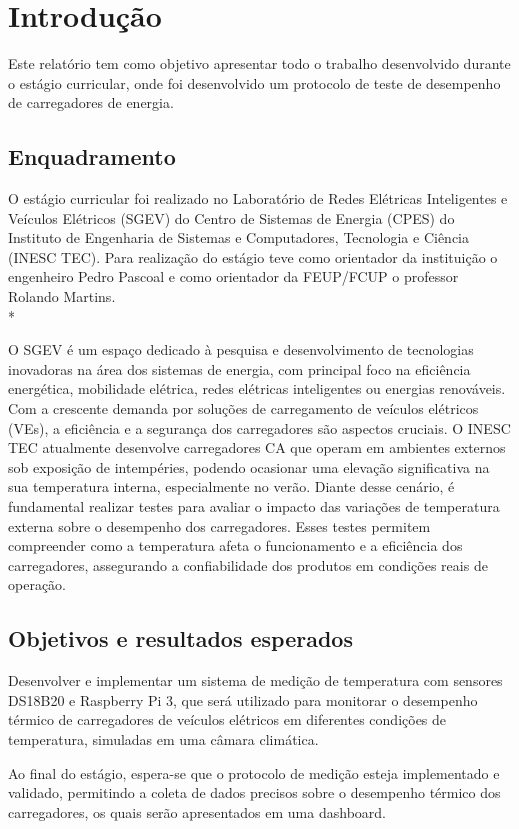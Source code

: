 \section{Introdução}
Este relatório tem como objetivo apresentar todo o trabalho desenvolvido 
durante o estágio curricular, onde foi desenvolvido um protocolo de teste de 
desempenho de carregadores de energia.

\subsection{Enquadramento}
O estágio curricular foi realizado no Laboratório de Redes Elétricas Inteligentes e Veículos Elétricos (SGEV) do 
Centro de Sistemas de Energia (CPES) do Instituto de Engenharia de Sistemas e Computadores, Tecnologia e Ciência 
(INESC TEC). Para realização do estágio teve como orientador da instituição o engenheiro Pedro Pascoal e como 
orientador da FEUP/FCUP o professor Rolando Martins. \\*

\noindent O SGEV é um espaço dedicado à pesquisa e desenvolvimento de tecnologias inovadoras na área dos sistemas de 
energia, com principal foco na eficiência energética, mobilidade elétrica, redes elétricas inteligentes ou 
energias renováveis.
Com a crescente demanda por soluções de carregamento de veículos elétricos
(VEs), a eficiência e a segurança dos carregadores são aspectos cruciais. O INESC TEC
atualmente desenvolve carregadores CA que operam em ambientes externos sob
exposição de intempéries, podendo ocasionar uma elevação significativa na sua
temperatura interna, especialmente no verão. Diante desse cenário, é fundamental realizar
testes para avaliar o impacto das variações de temperatura externa sobre o desempenho
dos carregadores. Esses testes permitem compreender como a temperatura afeta o
funcionamento e a eficiência dos carregadores, assegurando a confiabilidade dos
produtos em condições reais de operação.

	
\subsection{Objetivos e resultados esperados}
Desenvolver e implementar um sistema de medição de temperatura com sensores DS18B20 e Raspberry Pi 3, que será 
utilizado para monitorar o desempenho térmico de carregadores de veículos elétricos em diferentes condições de 
temperatura, simuladas em uma câmara climática.

Ao final do estágio, espera-se que o protocolo de medição esteja implementado e validado, permitindo a coleta de 
dados precisos sobre o desempenho térmico dos carregadores, os quais serão apresentados em uma dashboard.
